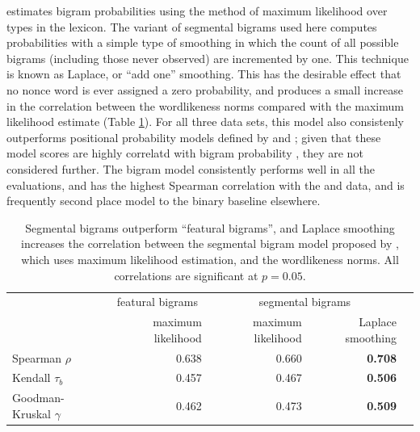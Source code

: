 \citeauthor{Albright2009a} estimates bigram probabilities using the method of maximum likelihood over types in the lexicon. The variant of segmental bigrams used here computes probabilities with a simple type of smoothing in which the count of all possible bigrams (including those never observed) are incremented by one. This technique is known as Laplace, or ``add one'' smoothing. This has the desirable effect that no nonce word is ever assigned a zero probability, and produces a small increase in the correlation between the \citeauthor{Albright2003b} wordlikeness norms compared with the maximum likelihood estimate (Table \ref{albrightimproved}). For all three data sets, this model also consistenly outperforms positional probability models defined by \citet{Vitevitch2004} and \citet{Vaden2009}; given that these model scores are highly correlatd with bigram probability \citep[][54]{Vitevitch1997}, they are not considered further. The bigram model consistently performs well in all the evaluations, and has the highest Spearman correlation with the \citeauthor{Greenberg1964} and \citeauthor{Scholes1966} data, and is frequently second place model to the binary baseline elsewhere.

\begin{table} 
\centering
\begin{tabular}{l r r r r}
\toprule
                         & \multicolumn{1}{c}{featural bigrams} & \multicolumn{2}{c}{segmental bigrams}  \\
                         & maximum likelihood                   & maximum likelihood & Laplace smoothing \\
\midrule
Spearman $\rho$          & 0.638                                & 0.660              & \textbf{0.708}    \\
Kendall $\tau_b$         & 0.457                                & 0.467              & \textbf{0.506}    \\
Goodman-Kruskal $\gamma$ & 0.462                                & 0.473              & \textbf{0.509}    \\
\bottomrule
\end{tabular}
\caption{Segmental bigrams outperform ``featural bigrams'', and Laplace smoothing increases the correlation between the segmental bigram model proposed by \citet{Albright2009a}, which uses maximum likelihood estimation, and the \citet{Albright2003b} wordlikeness norms. All correlations are significant at $p = 0.05$.}
\label{albrightimproved}
\end{table}

